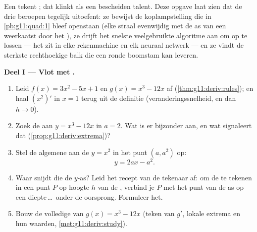 \begin{problem}
\label{pb:g11:deriv:1}
Een  tekent ; dat klinkt als een bescheiden talent. Deze
opgave laat zien dat de  drie beroepen tegelijk uitoefent: ze bewijst
de koplampstelling die in \cref{pb:g11:quad:1} bleef openstaan (elke straal
evenwijdig met de as van een  weerkaatst door het ), ze
drijft het snelste veelgebruikte algoritme aan om  op te lossen
--- het zit in elke rekenmachine en elk neuraal netwerk --- en ze vindt de
sterkste rechthoekige balk die een ronde boomstam kan leveren.

\medskip
\noindent\textbf{Deel I --- Vlot met .}
\begin{enumerate}
  \item Leid $f(x) = 3x^2 - 5x + 1$ en $g(x) = x^3 - 12x$ af
        (\cref{thm:g11:deriv:rules}); en haal $\left(x^2\right)'$ in $x = 1$
        terug uit de definitie (veranderingssnelheid, en dan $h \to 0$).
  \item Zoek de  aan $y = x^3 - 12x$ in $a = 2$. Wat is er
        bijzonder aan, en wat signaleert dat
        (\cref{prop:g11:deriv:extrema})?
  \item Stel de algemene  aan de  $y = x^2$ in het punt
        $(a, a^2)$ op:
        \[
        y = 2ax - a^2 .
        \]
  \item Waar snijdt die  de $y$-as? Leid het recept van de tekenaar
        af: om de  te tekenen in een punt $P$ op hoogte $h$ van de
        , verbind je $P$ met het punt van de as op een diepte\,\dots\
        onder de oorsprong. Formuleer het.
  \item Bouw de volledige  van $g(x) = x^3 - 12x$ (teken van
        $g'$, lokale extrema en hun waarden, \cref{met:g11:deriv:study}).
\end{enumerate}


\end{problem}
